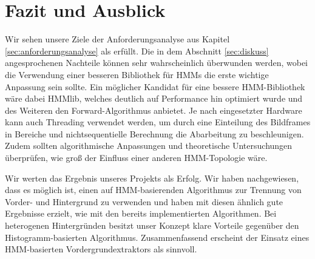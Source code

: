 \section{Fazit und Ausblick}
\label{chap:fazit}

Wir sehen unsere Ziele der Anforderungsanalyse aus Kapitel \ref{sec:anforderungsanalyse} als erfüllt. Die in dem Abschnitt \ref{sec:diskuss} angesprochenen Nachteile können sehr wahrscheinlich überwunden werden, wobei die Verwendung einer besseren Bibliothek für HMMs die erste wichtige Anpassung sein sollte. Ein möglicher Kandidat für eine bessere HMM-Bibliothek wäre dabei HMMlib\cite{hmmlib}, welches deutlich auf Performance hin optimiert wurde und des Weiteren den Forward-Algorithmus anbietet. Je nach eingesetzter Hardware kann auch Threading verwendet werden, um durch eine Einteilung des Bildframes in Bereiche und nichtsequentielle Berechnung die Abarbeitung zu beschleunigen. Zudem sollten algorithmische Anpassungen und theoretische Untersuchungen überprüfen, wie groß der Einfluss einer anderen HMM-Topologie wäre.


Wir werten das Ergebnis unseres Projekts als Erfolg. Wir haben nachgewiesen, dass es möglich ist, einen auf HMM-basierenden Algorithmus zur Trennung von Vorder- und Hintergrund zu verwenden und haben mit diesen ähnlich gute Ergebnisse erzielt, wie mit den bereits implementierten Algorithmen. Bei heterogenen Hintergründen besitzt unser Konzept klare Vorteile gegenüber den Histogramm-basierten Algorithmus. Zusammenfassend erscheint der Einsatz eines HMM-basierten Vordergrundextraktors als sinnvoll.





